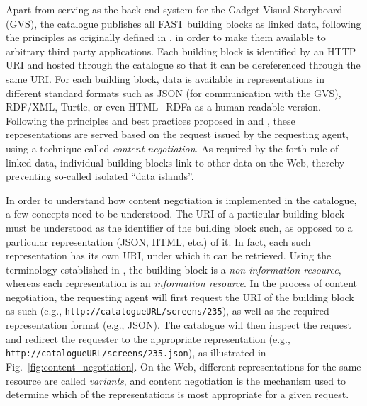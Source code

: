 \documentclass{fast_latex}
\begin{document}
Apart from serving as the back-end system for the Gadget Visual Storyboard (GVS), the catalogue publishes all FAST building blocks as linked data, following the principles as originally defined in \cite{bernersLee2006linkedData}, in order to make them available to arbitrary third party applications. Each building block is identified by an HTTP URI and hosted through the catalogue so that it can be dereferenced through the same URI. For each building block, data is available in representations in different standard formats such as JSON (for communication with the GVS), RDF/XML, Turtle, or even HTML+RDFa as a human-readable version. 
Following the principles and best practices proposed in \cite{berrueta2008} and \cite{sauermann2008cool_uris}, these representations are served based on the request issued by the requesting agent, using a technique called \emph{content negotiation}.
As required by the forth rule of linked data, individual building blocks link to other data on the Web, thereby preventing so-called isolated ``data islands''.

In order to understand how content negotiation is implemented in the catalogue, a few concepts need to be understood. The URI of a particular building block must be understood as the identifier of the building block such, as opposed to a particular representation (JSON, HTML, etc.) of it. In fact, each such representation has its own URI, under which it can be retrieved. Using the terminology established in \cite{w3c2004webArchitecture}, the building block is a \emph{non-information resource}, whereas each representation is an \emph{information resource}. In the process of content negotiation, the requesting agent will first request the URI of the building block as such (e.g., \verb|http://catalogueURL/screens/235|), as well as the required representation format (e.g., JSON). The catalogue will then inspect the request and redirect the requester to the appropriate representation (e.g., \verb|http://catalogueURL/screens/235.json|), as illustrated in Fig.~\ref{fig:content_negotiation}.
On the Web, different representations for the same resource are called \emph{variants}, and content negotiation is the mechanism used to determine which of the representations is most appropriate for a given request.
\end{document}
